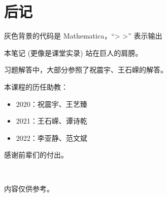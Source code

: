 \section{后记}

灰色背景的代码是 Mathematica，``> >'' 表示输出

本笔记 (更像是课堂实录) 站在巨人的肩膀。

习题解答中，大部分参照了祝震宇、王石嵘的解答。

本课程的历任助教：
\begin{itemize}
    \item 2020：祝震宇、王艺臻
    \item 2021：王石嵘、谭诗乾
    \item 2022：李亚静、范文斌
\end{itemize}

感谢前辈们的付出。

~

内容仅供参考。
